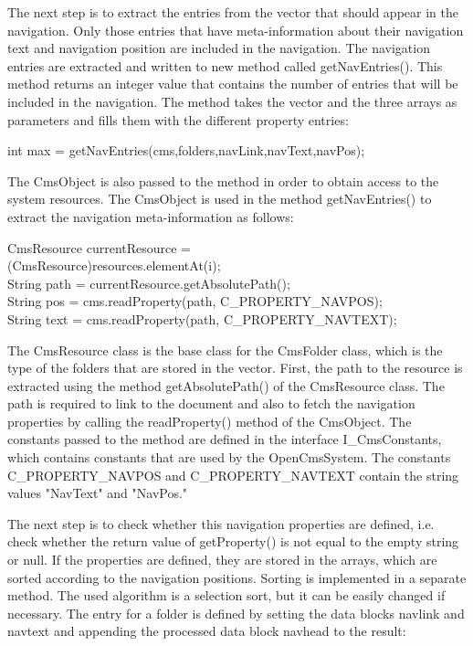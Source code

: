 The next step is to extract the entries from the vector that should
appear in the navigation. Only those entries that have meta-information
about their navigation text and navigation position are included in the
navigation. The navigation entries are extracted and written to new
method called {\meth getNavEntries()}. This method returns an integer value
that contains the number of entries that will be included in the
navigation. The method takes the vector and the three arrays as
parameters and fills them with the different property entries:

{\code int max = getNavEntries(cms,folders,navLink,navText,navPos);}

The CmsObject is also passed to the method in order to obtain access to
the system resources. The CmsObject is used in the method {\meth getNavEntries()}
to extract the navigation meta-information as follows:

\begin{java}
CmsResource currentResource =\\
\jtabd     (CmsResource)resources.elementAt(i);\\
String path = currentResource.getAbsolutePath();\\
String pos = cms.readProperty(path, C\_PROPERTY\_NAVPOS);\\
String text = cms.readProperty(path, C\_PROPERTY\_NAVTEXT);\\
\end{java}

The {\class CmsResource} class is the base class for the CmsFolder class, which
is the type of the folders that are stored in the vector. First, the
path to the resource is extracted using the method {\meth getAbsolutePath()} of
the {\class CmsResource} class. The path is required to link to the document and
also to fetch the navigation properties by calling the {\meth readProperty()}
method of the CmsObject. The constants passed to the method are defined
in the interface  {\meth I\_CmsConstants}, which contains constants that are used
by the OpenCmsSystem. The constants {\meth C\_PROPERTY\_NAVPOS} and
{\meth C\_PROPERTY\_NAVTEXT} contain the string values {\code "NavText"} and {\code "NavPos."}

The next step is to check whether this navigation properties are
defined, i.e.  check whether the return value of {\meth getProperty()} is not
equal to the empty string or null. If the properties are defined, they
are stored in the arrays, which are sorted according to the navigation
positions. Sorting is implemented in a separate method. The used
algorithm is a selection sort, but it can be easily changed if necessary.
The entry for a folder is defined by setting the data blocks {\name navlink}
and {\name navtext} and appending the processed data block {\name navhead} to the
result:

